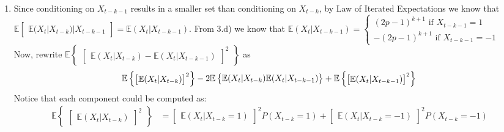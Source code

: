 \documentclass[]{article}
\begin{document}
\begin{enumerate}[label=\alph*)]
	\item Since conditioning on $X_{t-k-1}$ results in a smaller set than conditioning on $X_{t-k}$, by Law of Iterated Expectations we know that $\mathbb{E}\begin{bmatrix}\mathbb{E}(X_t|X_{t-k})|X_{t-k-1}\end{bmatrix} = \mathbb{E}(X_t|X_{t-k-1})$. From 3.d) we know that $\mathbb{E}(X_t|X_{t-k-1})=\begin{cases}(2p-1)^{k+1}\text{ if }X_{t-k-1}=1 \\ -(2p-1)^{k+1}\text{ if }X_{t-k-1}=-1 \end{cases}$ \\
	Now, rewrite $\mathbb{E}\begin{Bmatrix}\begin{bmatrix}\mathbb{E}(X_t|X_{t-k})-\mathbb{E}(X_t|X_{t-k-1})\end{bmatrix}^2\end{Bmatrix}$ as
	\begin{equation}
		\mathbb{E}\begin{Bmatrix}
		\begin{bmatrix}\mathbb{E}(X_t|X_{t-k})\end{bmatrix}^2\end{Bmatrix} - 2\mathbb{E}\begin{Bmatrix}\mathbb{E}(X_t|X_{t-k})\mathbb{E}(X_t|X_{t-k-1})\end{Bmatrix} + \mathbb{E}\begin{Bmatrix}\begin{bmatrix}\mathbb{E}(X_t|X_{t-k-1})\end{bmatrix}^2\end{Bmatrix} \\ \nonumber
	\end{equation}
	Notice that each component could be computed as:
	\begin{equation}
		\begin{split}
			\mathbb{E}\begin{Bmatrix}\begin{bmatrix}\mathbb{E}(X_t|X_{t-k})\end{bmatrix}^2\end{Bmatrix}& = \begin{bmatrix}\mathbb{E}(X_t|X_{t-k}=1)\end{bmatrix}^2 P(X_{t-k}=1) + \begin{bmatrix}\mathbb{E}(X_t|X_{t-k}=-1)\end{bmatrix}^2 P(X_{t-k}=-1) \\ \nonumber

\end{split}
\end{equation}
\end{enumerate}
\end{document}
